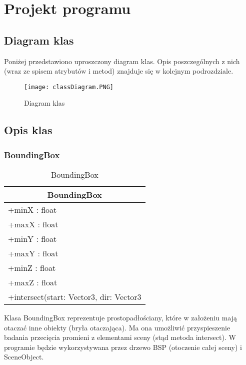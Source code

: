 \section{Projekt programu}

	\subsection{Diagram klas}
	
	Poniżej przedstawiono uproszczony diagram klas. Opis poszczególnych z nich (wraz ze spisem atrybutów i metod) znajduje się w kolejnym podrozdziale.
	
	\begin{figure}[H]
    \centering
              \texttt{[image: classDiagram.PNG]}
    \caption{Diagram klas}
    \label{fig:classDiagram}
	\end{figure}
	
	
	
\subsection{Opis klas}

\subsubsection{BoundingBox}


\footnotesize
\footnotesize
\begin{longtable}{|p{14cm}|}
	\caption{BoundingBox} \label{tab:BoundingBox} \\ \hline
	\multicolumn{1}{|c|}{BoundingBox} \\ \hline
    +minX : float \\
    +maxX : float \\
    +minY : float \\
    +maxY : float \\
    +minZ : float \\
    +maxZ : float \\ \hline
    +intersect(start: Vector3, dir: Vector3 \\ \hline
\end{longtable}
\normalsize

Klasa BoundingBox reprezentuje prostopadłościany, które w założeniu mają otaczać inne obiekty (bryła otaczająca). Ma ona umożliwić przyspieszenie badania przecięcia promieni z elementami sceny (stąd metoda intersect). W programie będzie wykorzystywana przez drzewo BSP (otoczenie całej sceny) i SceneObject. 



